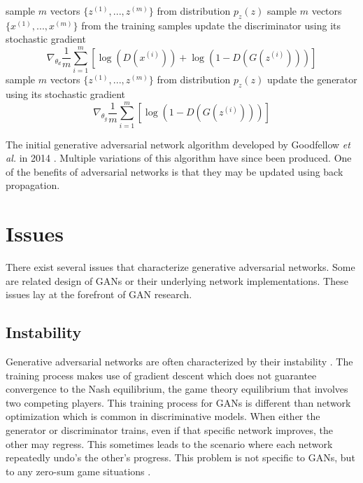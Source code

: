 \documentclass[11pt]{article}
\begin{document}
\begin{algorithm}[H]
  \SetAlgoLined
   \linebreak
   \linebreak
   {
     {
      sample $m$ vectors $\{z^{(1)},...,z^{(m)}\}$ from distribution $p_z(z)$\;
      sample $m$ vectors $\{x^{(1)},...,x^{(m)}\}$ from the training samples\;
      update the discriminator using its stochastic gradient
      $$\nabla_{\theta_d}\frac{1}{m}\sum_{i=1}^{m}[\log(D(x^{(i)}))+\log(1-D(G(z^{(i)})))]$$
    }
    sample $m$ vectors $\{z^{(1)},...,z^{(m)}\}$ from distribution $p_z(z)$\;
    update the generator using its stochastic gradient\;
    $$\nabla_{\theta_g}\frac{1}{m}\sum_{i=1}^{m}[\log(1-D(G(z^{(i)})))]$$
  }
  \caption{The initial generative adversarial network algorithm developed by Goodfellow \textit{et al.} in 2014 \citep{2014arXiv1406.2661G}. Multiple variations of this algorithm have since been produced. One of the benefits of adversarial networks is that they may be updated using back propagation.}
\end{algorithm}



\section{Issues}
There exist several issues that characterize generative adversarial networks. Some are related design of GANs or their underlying network implementations. These issues lay at the forefront of GAN research.

\subsection{Instability}
Generative adversarial networks are often characterized by their instability \citep{2017arXiv170100160G}. The training process makes use of gradient descent which does not guarantee convergence to the Nash equilibrium, the game theory equilibrium that involves two competing players. This training process for GANs is different than network optimization which is common in discriminative models. When either the generator or discriminator trains, even if that specific network improves, the other may regress. This sometimes leads to the scenario where each network repeatedly undo's the other's progress. This problem is not specific to GANs, but to any zero-sum game situations \citep{2017arXiv170100160G}.
\end{document}
